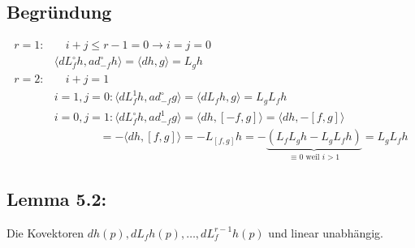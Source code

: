 \documentclass[ngerman]{tudscrreprt}
\begin{document}
\subsection*{Begründung}
\begin{align*} r=1: & \quad i +j \le r-1 = 0 \rightarrow i= j = 0\\ 
& \langle dL_f^\circ h, ad_{-f}^\circ h \rangle = \langle dh,g\rangle = L_gh \\ 
r=2:& \quad i+j = 1 \\ 
& i=1, j=0: \langle dL_f^1 h, ad_{-f}^\circ g\rangle = \langle dL_fh,g\rangle = L_g L_f h\\ 
& i=0, j=1: \langle dL_f^\circ h,ad_{-f}^1 g\rangle = \langle dh, [-f,g] \rangle = \langle dh, -[f,g] \rangle \\ 
&\qquad \qquad = -\langle dh, [f,g]\rangle = -L_{[f,g]}h = -\underbrace{(L_f L_g h - L_g L_f h)}_{\equiv 0\text{ weil } i>1} = L_g L_f h
\end{align*}
\subsection*{Lemma 5.2:} Die Kovektoren $dh(p), dL_fh(p),\dots, dL_f^{r-1} h(p)$ und linear unabhängig. 
\end{document}
